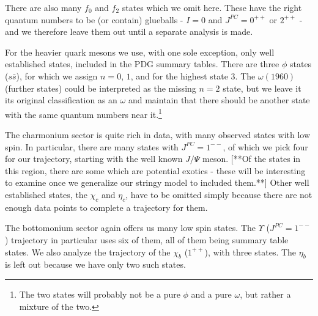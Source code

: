 \documentclass[11pt,a4]{article}
\newcommand{\ssb}{s\bar{s}}
\begin{document}
There are also many \(f_0\) and \(f_2\) states which we omit here. These have the right quantum numbers to be (or contain) glueballs - \(I = 0\) and \(J^{PC} = 0^{++}\) or \(2^{++}\) - and we therefore leave them out until a separate analysis is made.

For the heavier quark mesons we use, with one sole exception, only well established states, included in the PDG summary tables. There are three \(\phi\) states (\(\ssb\)), for which we assign \(n = 0\), \(1\), and for the highest state \(3\). The \(\omega(1960)\) (further states) could be interpreted as the missing \(n = 2\) state, but we leave it its original classification as an \(\omega\) and maintain that there should be another state with the same quantum numbers near it.\footnote{The two states will probably not be a pure \(\phi\) and a pure \(\omega\), but rather a mixture of the two.}

The charmonium sector is quite rich in data, with many observed states with low spin. In particular, there are many states with \(J^{PC} = 1^{--}\), of which we pick four for our trajectory, starting with the well known \(J/\Psi\) meson. [**Of the states in this region, there are some which are potential exotics - these will be interesting to examine once we generalize our stringy model to included them.**] Other well established states, the \(\chi_c\) and \(\eta_c\), have to be omitted simply because there are not enough data points to complete a trajectory for them.

The bottomonium sector again offers us many low spin states. The \(\Upsilon\) (\(J^{PC} = 1^{--}\)) trajectory in particular uses six of them, all of them being summary table states. We also analyze the trajectory of the \(\chi_b\) (\(1^{++}\)), with three states. The \(\eta_b\) is left out because we have only two such states.
\end{document}
